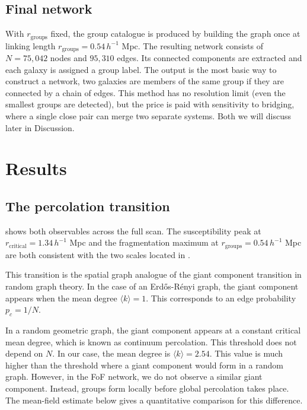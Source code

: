 \documentclass[9pt,a4paper,twocolumn,twoside]{rho-class/rho}
\begin{document}
\subsection{Final network}

With $r_{\mathrm{groups}}$ fixed, the group catalogue is produced by building
the graph once at linking length $r_{\mathrm{groups}} = 0.54\,h^{-1}$ Mpc. The
resulting network consists of $N = 75{,}042$ nodes and $95{,}310$ edges. Its
connected components are extracted and each galaxy is assigned a group label.
The output is the most basic way to construct a network, two galaxies are members
of the same group if they are connected by a chain of edges. This method has no
resolution limit (even the smallest groups are detected), but the price is paid
with sensitivity to bridging, where a single close pair can merge two separate
systems. Both we will discuss later in Discussion.

\section{Results}

\subsection{The percolation transition}

 shows both observables across the full scan. The
susceptibility peak at $r_{\mathrm{critical}} = 1.34\,h^{-1}$ Mpc and the
fragmentation maximum at $r_{\mathrm{groups}} = 0.54\,h^{-1}$ Mpc are both
consistent with the two scales located in .

This transition is the spatial graph analogue of the giant component transition
in random graph theory. In the case of an Erd\H{o}s-R\'enyi graph, the giant
component appears when the mean degree $\langle k\rangle = 1$. This corresponds
to an edge probability $p_c = 1/N$.

In a random geometric graph, the giant component appears at a constant critical
mean degree, which is known as continuum percolation. This threshold does not
depend on $N$. In our case, the mean degree is $\langle k\rangle = 2.54$. This
value is much higher than the threshold where a giant component would form in a
random graph. However, in the FoF network, we do not observe a similar giant
component. Instead, groups form locally before global percolation takes place.
The mean-field estimate below gives a quantitative comparison for this
difference.
\end{document}

